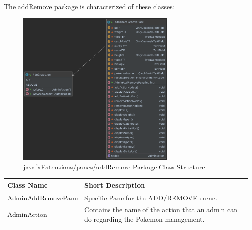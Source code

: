 The addRemove package is characterized of these classes:
\begin{figure}[H]
	\centering
	\includegraphics[width=0.7\textwidth]{img/javafx_panes_package3.png}
	\caption{javafxExtensions/panes/addRemove Package Class Structure}
\end{figure}
\begin{center}
	\begin{tabular}{| m{14em} | m{19em} |} 
		\hline
		\textbf{Class Name} & \textbf{Short Description} \\ [0.5ex] 
		\hline
		AdminAddRemovePane & Specific Pane for the ADD/REMOVE scene.\\ 
		\hline
		AdminAction & Contains the name of the action that an admin can do regarding the Pokemon management.\\ 
		\hline
	\end{tabular}
\end{center}


